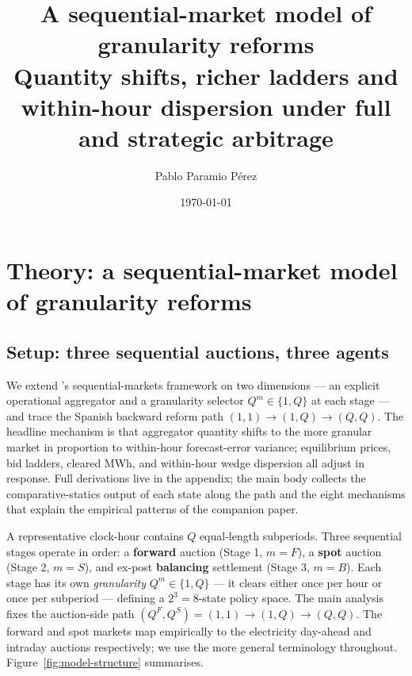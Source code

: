 \documentclass[11pt]{article}
\title{\vspace{-1.5cm}\large A sequential-market model of granularity reforms\\[-2pt]\normalsize Quantity shifts, richer ladders and within-hour dispersion under full and strategic arbitrage\vspace{-0.4cm}}
\author{\normalsize Pablo Paramio P\'erez}
\date{\normalsize\today}
\begin{document}
\maketitle
\vspace{-0.8cm}


\section{Theory: a sequential-market model of granularity reforms}\label{sec:theory}

\subsection{Setup: three sequential auctions, three agents}\label{sec:setup}

We extend \citet{ito_reguant_2016}'s sequential-markets framework on two dimensions --- an explicit operational aggregator and a granularity selector $Q^m \in \{1, Q\}$ at each stage --- and trace the Spanish backward reform path $(1,1) \to (1,Q) \to (Q,Q)$. The headline mechanism is that aggregator quantity shifts to the more granular market in proportion to within-hour forecast-error variance; equilibrium prices, bid ladders, cleared MWh, and within-hour wedge dispersion all adjust in response. Full derivations live in the appendix; the main body collects the comparative-statics output of each state along the path and the eight mechanisms that explain the empirical patterns of the companion paper.

A representative clock-hour contains $Q$ equal-length subperiods. Three sequential stages operate in order: a \textbf{forward} auction (Stage 1, $m=F$), a \textbf{spot} auction (Stage 2, $m=S$), and ex-post \textbf{balancing} settlement (Stage 3, $m=B$). Each stage has its own \emph{granularity} $Q^m \in \{1, Q\}$ --- it clears either once per hour or once per subperiod --- defining a $2^3 = 8$-state policy space. The main analysis fixes the auction-side path $(Q^{F}, Q^{S}) = (1,1) \to (1,Q) \to (Q,Q)$. The forward and spot markets map empirically to the electricity day-ahead and intraday auctions respectively; we use the more general terminology throughout. Figure~\ref{fig:model-structure} summarises.
\end{document}
